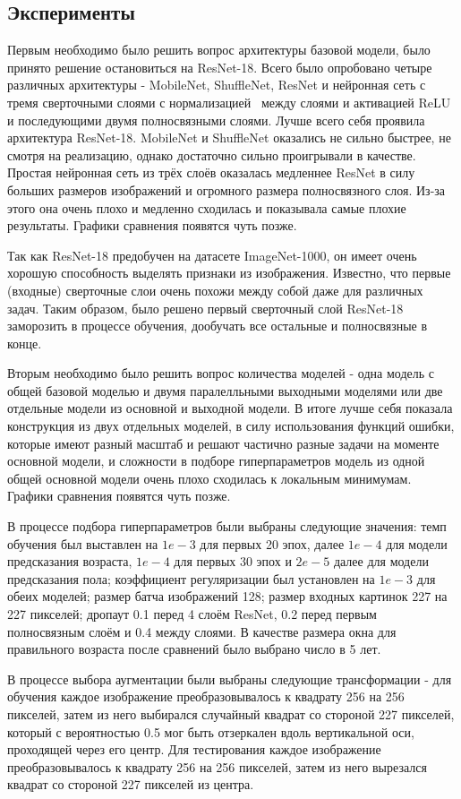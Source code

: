 \subsection{Эксперименты}\label{subsec:эксперименты}
Первым необходимо было решить вопрос архитектуры базовой модели, было принято решение остановиться на ResNet-18.
Всего было опробовано четыре различных архитектуры - MobileNet, ShuffleNet, ResNet и
нейронная сеть с тремя сверточными слоями с нормализацией~\cite{LRN} между слоями и активацией ReLU и последующими двумя полносвязными слоями.
Лучше всего себя проявила архитектура ResNet-18.
MobileNet и ShuffleNet оказались не сильно быстрее, не смотря на реализацию, однако достаточно сильно проигрывали в качестве.
Простая нейронная сеть из трёх слоёв оказалась медленнее ResNet в силу больших размеров изображений и огромного размера полносвязного слоя.
Из-за этого она очень плохо и медленно сходилась и показывала самые плохие результаты.
Графики сравнения появятся чуть позже.
\par Так как ResNet-18 предобучен на датасете ImageNet-1000, он имеет очень хорошую способность выделять признаки из изображения.
Известно, что первые (входные) сверточные слои очень похожи между собой даже для различных задач.
Таким образом, было решено первый сверточный слой ResNet-18 заморозить в процессе обучения, дообучать все остальные и полносвязные в конце.
\par Вторым необходимо было решить вопрос количества моделей - одна модель с общей базовой моделью и двумя паралелльными выходными моделями
или две отдельные модели из основной и выходной модели.
В итоге лучше себя показала конструкция из двух отдельных моделей, в силу использования функций ошибки,
которые имеют разный масштаб и решают частично разные задачи на моменте основной модели,
и сложности в подборе гиперпараметров модель из одной общей основной модели очень плохо сходилась к локальным минимумам.
Графики сравнения появятся чуть позже.
\par В процессе подбора гиперпараметров были выбраны следующие значения: темп обучения был выставлен на $1e-3$ для первых 20 эпох,
далее $1e-4$ для модели предсказания возраста, $1e-4$ для первых 30 эпох и $2e-5$ далее для модели предсказания пола;
коэффициент регуляризации был установлен на $1e-3$ для обеих моделей;
размер батча изображений 128;
размер входных картинок 227 на 227 пикселей;
дропаут 0.1 перед 4 слоём ResNet, 0.2 перед первым полносвязным слоём и 0.4 между слоями.
В качестве размера окна для правильного возраста после сравнений было выбрано число в 5 лет.
\par В процессе выбора аугментации были выбраны следующие трансформации -
для обучения каждое изображение преобразовывалось к квадрату 256 на 256 пикселей,
затем из него выбирался случайный квадрат со стороной 227 пикселей,
который с вероятностью 0.5 мог быть отзеркален вдоль вертикальной оси, проходящей через его центр.
Для тестирования каждое изображение преобразовывалось к квадрату 256 на 256 пикселей,
затем из него вырезался квадрат со стороной 227 пикселей из центра.

